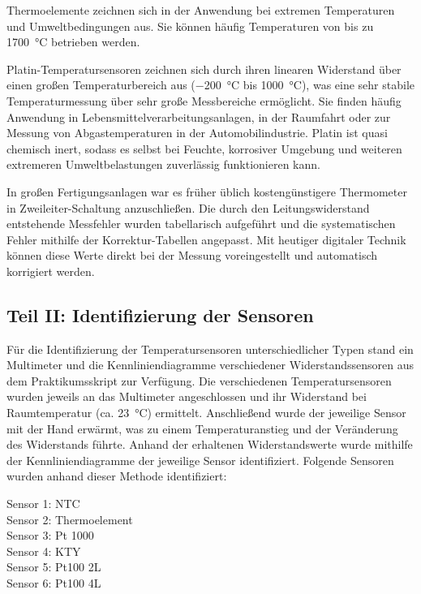 Thermoelemente zeichnen sich in der Anwendung bei extremen Temperaturen und Umweltbedingungen aus. Sie können häufig Temperaturen von bis zu \SI{1700}{\celsius} betrieben werden. 

Platin-Temperatursensoren zeichnen sich durch ihren linearen Widerstand über einen großen Temperaturbereich aus (\SI{-200}{\celsius} bis \SI{1000}{\celsius}), was eine sehr stabile Temperaturmessung über sehr große Messbereiche ermöglicht. Sie finden häufig Anwendung in Lebensmittelverarbeitungsanlagen, in der Raumfahrt oder zur Messung von Abgastemperaturen in der Automobilindustrie. Platin ist quasi chemisch inert, sodass es selbst bei Feuchte, korrosiver Umgebung und weiteren extremeren Umweltbelastungen zuverlässig funktionieren kann. 

In großen Fertigungsanlagen war es früher üblich kostengünstigere Thermometer in Zweileiter-Schaltung anzuschließen. Die durch den Leitungswiderstand entstehende Messfehler wurden tabellarisch aufgeführt und die systematischen Fehler mithilfe der Korrektur-Tabellen angepasst. Mit heutiger digitaler Technik können diese Werte direkt bei der Messung voreingestellt und automatisch korrigiert werden. 

\subsection{Teil II: Identifizierung der Sensoren}

Für die Identifizierung der Temperatursensoren unterschiedlicher Typen stand ein Multimeter und die Kennliniendiagramme verschiedener Widerstandssensoren aus dem Praktikumsskript zur Verfügung. Die verschiedenen Temperatursensoren wurden jeweils an das Multimeter angeschlossen und ihr Widerstand bei Raumtemperatur (ca. \SI{23}{\celsius}) ermittelt. Anschließend wurde der jeweilige Sensor mit der Hand erwärmt, was zu einem Temperaturanstieg und der Veränderung des Widerstands führte. Anhand der erhaltenen Widerstandswerte wurde mithilfe der Kennliniendiagramme der jeweilige Sensor identifiziert. 
Folgende Sensoren wurden anhand dieser Methode identifiziert:

Sensor 1: NTC\\
Sensor 2: Thermoelement\\
Sensor 3: Pt 1000\\
Sensor 4: KTY\\
Sensor 5: Pt100 2L\\
Sensor 6: Pt100 4L\\

